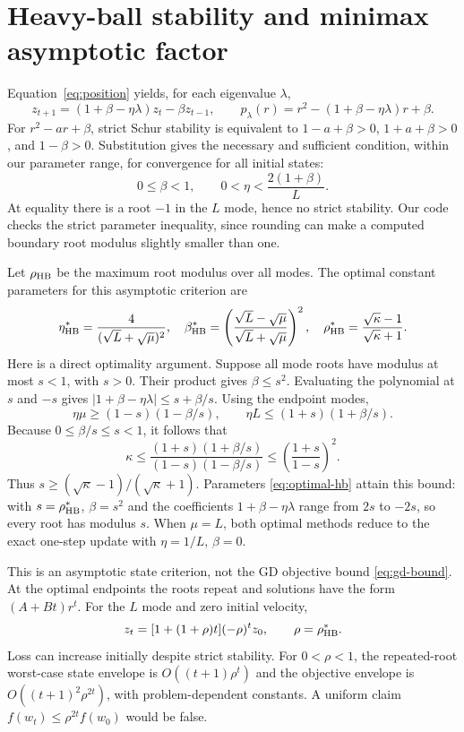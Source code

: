 \documentclass[11pt,a4paper]{article}
\begin{document}
\section{Heavy-ball stability and minimax asymptotic factor}
Equation~\eqref{eq:position} yields, for each eigenvalue $\lambda$,
\[
 z_{t+1}=(1+\beta-\eta\lambda)z_t-\beta z_{t-1},\qquad
 p_\lambda(r)=r^2-(1+\beta-\eta\lambda)r+\beta.
\]
For $r^2-ar+\beta$, strict Schur stability is equivalent to
$1-a+\beta>0$, $1+a+\beta>0$, and $1-\beta>0$.
Substitution gives the necessary and sufficient condition, within our parameter
range, for convergence for all initial states:
\begin{equation}
 0\le\beta<1,\qquad 0<\eta<\frac{2(1+\beta)}L.
 \label{eq:stability}
\end{equation}
At equality there is a root $-1$ in the $L$ mode, hence no strict stability.
Our code checks the strict parameter inequality, since rounding can make a
computed boundary root modulus slightly smaller than one.

Let $\rho_{\rm HB}$ be the maximum root modulus over all modes. The optimal
constant parameters for this asymptotic criterion are
\begin{equation}
 \eta^*_{\rm HB}=\frac4{(\sqrt L+\sqrt\mu)^2},\quad
 \beta^*_{\rm HB}=\left(\frac{\sqrt L-\sqrt\mu}{\sqrt L+\sqrt\mu}\right)^2,
 \quad \rho^*_{\rm HB}=\frac{\sqrt\kappa-1}{\sqrt\kappa+1}.
 \label{eq:optimal-hb}
\end{equation}
Here is a direct optimality argument. Suppose all mode roots have modulus at
most $s<1$, with $s>0$. Their product gives $\beta\le s^2$. Evaluating the
polynomial at $s$ and $-s$ gives
$|1+\beta-\eta\lambda|\le s+\beta/s$.
Using the endpoint modes,
\[
 \eta\mu\ge(1-s)(1-\beta/s),\qquad
 \eta L\le(1+s)(1+\beta/s).
\]
Because $0\le\beta/s\le s<1$, it follows that
\[
 \kappa\le\frac{(1+s)(1+\beta/s)}{(1-s)(1-\beta/s)}
 \le\left(\frac{1+s}{1-s}\right)^2.
\]
Thus $s\ge(\sqrt\kappa-1)/(\sqrt\kappa+1)$. Parameters
\eqref{eq:optimal-hb} attain this bound: with $s=\rho^*_{\rm HB}$,
$\beta=s^2$ and the coefficients $1+\beta-\eta\lambda$ range from $2s$ to
$-2s$, so every root has modulus $s$. When $\mu=L$, both optimal methods reduce
to the exact one-step update with $\eta=1/L$, $\beta=0$.

This is an asymptotic state criterion, not the GD objective bound
\eqref{eq:gd-bound}. At the optimal endpoints the roots repeat and solutions
have the form $(A+Bt)r^t$. For the $L$ mode and zero initial velocity,
\begin{equation}
 z_t=[1+(1+\rho)t](-\rho)^t z_0,\qquad \rho=\rho^*_{\rm HB}.
 \label{eq:transient}
\end{equation}
Loss can increase initially despite strict stability. For $0<\rho<1$, the
repeated-root worst-case state envelope is $O((t+1)\rho^t)$ and the objective
envelope is $O((t+1)^2\rho^{2t})$, with problem-dependent constants. A uniform
claim $f(w_t)\le\rho^{2t}f(w_0)$ would be false.
\end{document}
